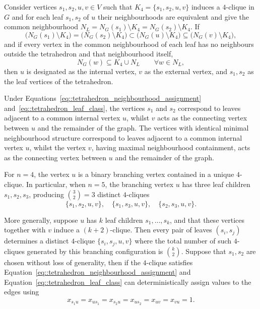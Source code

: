 \documentclass[11pt]{article}
\begin{document}
Consider vertices $s_1,s_2,u,v\in V$ such that $K_4 = \{s_1,s_2,u,v\}$ induces a $4$-clique in $G$ and for each leaf $s_1, s_2$ of $u$ their neighbourhoods are equivalent and give the common neighbourhood $N_L = N_G(s_1)\setminus K_4 =N_G(s_2) \setminus K_4$. If
\begin{equation} \label{eq::tetrahedron_neighbourhood_assignment}
\big( N_G(s_1)\setminus K_4 \big)
=
\big( N_G(s_2)\setminus K_4 \big)
\subset
\big( N_G(u)\setminus K_4 \big)
\subseteq
\big( N_G(v)\setminus K_4 \big),
\end{equation}
and if every vertex in the common neighbourhood of each leaf has no neighbours outside the tetrahedron and that neighbourhood itself,
\begin{equation} \label{eq::tetrahedron_leaf_class}
N_G(w) \subseteq K_4 \cup N_L \qquad \forall w\in N_L,
\end{equation}
then $u$ is designated as the internal vertex, $v$ as the external vertex, and $s_1,s_2$ as the leaf vertices of the tetrahedron.

Under Equations~\eqref{eq::tetrahedron_neighbourhood_assignment} and~\eqref{eq::tetrahedron_leaf_class}, the vertices $s_1$ and $s_2$ correspond to leaves adjacent to a common internal vertex $u$, whilst $v$ acts as the connecting vertex between $u$ and the remainder of the graph. The vertices with identical minimal neighbourhood structure correspond to leaves adjacent to a common internal vertex $u$, whilst the vertex $v$, having maximal neighbourhood containment, acts as the connecting vertex between $u$ and the remainder of the graph.

For $n=4$, the vertex $u$ is a binary branching vertex contained in a unique $4$-clique. In particular, when $n=5$, the branching vertex $u$ has three leaf children $s_1,s_2,s_3$, producing $\displaystyle {3 \choose 2} =3$ distinct $4$-cliques
\[
\{s_1,s_2,u,v\},\quad
\{s_1,s_3,u,v\},\quad
\{s_2,s_3,u,v\}.
\]

More generally, suppose $u$ has $k$ leaf children $s_1,\dots,s_k$, and that these vertices together with $v$ induce a $(k+2)$-clique. Then every pair of leaves $(s_i,s_j)$ determines a distinct $4$-clique $\{s_i,s_j,u,v\}$ where the total number of such $4$-cliques generated by this branching configuration is $ \displaystyle {k \choose 2}$. Suppose that $s_1,s_2$ are chosen without loss of generality, then if the $4$-clique satisfies Equation~\eqref{eq::tetrahedron_neighbourhood_assignment} and Equation~\eqref{eq::tetrahedron_leaf_class} can deterministically assign values to the edges using  
\begin{equation} \label{eq:tetrahedron_fix}
x_{s_1u}=x_{us_1} = x_{s_2u}=x_{us_2} = x_{uv}=x_{vu} = 1. 
\end{equation}
\end{document}
